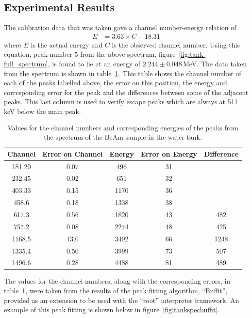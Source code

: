 \subsection{Experimental Results} %
\label{sub:experimental_results}
The calibration data that was taken gave a channel number-energy relation of
\begin{align}
	E &= 3.63\times C - 18.31
\end{align}
where $E$ is the actual energy and $C$ is the observed channel number. Using this equation, peak number 5 from the above spectrum, figure~\ref{fig:tank-full_spectrum}, is found to lie at an energy of $2.244\pm0.048$\,MeV. The data taken from the spectrum is shown in table~\ref{tab:tankdata}. This table shows the channel number of each of the peaks labelled above, the error on this position, the energy and corresponding error for the peak and the differences between some of the adjacent peaks. This last column is used to verify escape peaks which are always at 511\,keV below the main peak.
\begin{table}[ht]
	\centering
	\begin{tabular}{c|c|c|c|c}
		Channel \textnumero & Error on Channel \textnumero & Energy & Error on Energy & Difference \\
		\hline\hline
		181.20 & 0.07 & 496 & 31 & \\
		232.45 & 0.02 & 651 & 32 &  \\
		403.33 & 0.15 & 1170 & 36 &  \\
		458.6 & 0.18 & 1338 & 38 &  \\
		617.3 & 0.56 & 1820 & 43 & 482 \\
		757.2 & 0.08 & 2244 & 48 & 425 \\
		1168.5 & 13.0 & 3492 & 66 & 1248 \\
		1335.4 & 0.50 & 3999 & 73 & 507 \\
		1496.6 & 0.28 & 4488 & 81 & 489
	\end{tabular}
	\caption{Values for the channel numbers and corresponding energies of the peaks from the spectrum of the BeAm sample in the water tank.\label{tab:tankdata}}
\end{table}

The values for the channel numbers, along with the corresponding errors, in table~\ref{tab:tankdata}, were taken from the results of the peak fitting algorithm, ``Buffit'', provided as an extension to be used with the ``root'' interpreter framework. An example of this peak fitting is shown below in figure~\ref{fig:tankspecbuffit}.

